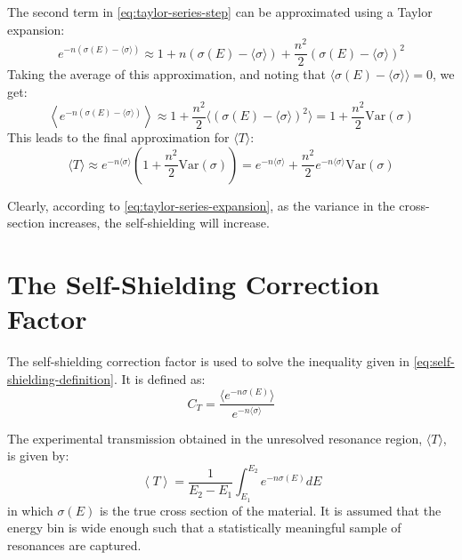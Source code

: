 The second term in \autoref{eq:taylor-series-step} can be approximated using a Taylor expansion:
\begin{equation}
    e^{-n \left( \sigma(E) - \langle \sigma \rangle \right)} \approx 1 + n (\sigma(E) - \langle \sigma \rangle) + \frac{n^{2}}{2} (\sigma(E) - \langle \sigma \rangle)^2
\end{equation}
Taking the average of this approximation, and noting that $\langle \sigma(E) - \langle \sigma \rangle \rangle = 0$, we get:
\begin{equation}
    \left\langle e^{-n \left( \sigma(E) - \langle \sigma \rangle \right)} \right\rangle \approx 1 + \frac{n^{2}}{2} \langle (\sigma(E) - \langle \sigma \rangle)^2 \rangle = 1 + \frac{n^{2}}{2} \text{Var}(\sigma)
\end{equation}
This leads to the final approximation for $\langle T \rangle$:
\begin{equation}
    \label{eq:taylor-series-expansion}
    \langle T \rangle \approx e^{-n \langle \sigma \rangle} \left(1 + \frac{n^{2}}{2} \text{Var}(\sigma) \right) = e^{-n \langle \sigma \rangle} + \frac{n^{2}}{2} e^{-n \langle \sigma \rangle} \text{Var}(\sigma)
\end{equation}

Clearly, according to \autoref{eq:taylor-series-expansion}, as the variance in the cross-section increases, the self-shielding will increase.

\section{The Self-Shielding Correction Factor}
\label{sec:correction-factor}

The self-shielding correction factor is used to solve the inequality given in \autoref{eq:self-shielding-definition}. It is defined as:
\begin{equation}
    C_{T} = \frac{\langle e^{-n \sigma (E)} \rangle}{ e ^{- n \langle \sigma \rangle}}
\end{equation}

The experimental transmission obtained in the unresolved resonance region, $\langle T \rangle$, is given by:
\begin{equation}
    \label{eq:transmission}
    \left\langle T \right\rangle = \frac{1}{E_2 - E_1} \int_{E_1}^{E_2} e^{-n \sigma(E)}dE
\end{equation}
in which $\sigma(E)$ is the true cross section of the material. It is assumed that the energy bin is wide enough such that a statistically meaningful sample of resonances are captured.

